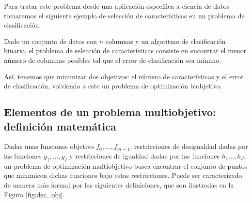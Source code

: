 Para tratar este problema desde una aplicación específica a ciencia de datos tomaremos el siguiente ejemplo de selección de características en un problema de clasificación:

\begin{texample} \label{ex:Selecc}
    Dado un conjunto de datos con $n$ columnas y un algoritmo de clasificación binario, el problema de selección de características consiste en encontrar el menor número de columnas posibles tal que el error de clasificación sea mínimo.
    
    Así, tenemos que minimizar dos objetivos: el número de características y el error de clasificación, volviendo a este un problema de optimización biobjetivo. 
\end{texample}


\subsection{Elementos de un problema multiobjetivo: definición matemática} \label{sec:Dominancia_Pareto}

Dadas unas funciones objetivo $f_0,\ldots, f_{m-1}$, restricciones de desigualdad dadas por las funciones $g_1,\ldots,g_I$ y restricciones de igualdad dadas por las funciones $h_1 \ldots, h_J$, un problema de optimización multiobjetivo busca encontrar el conjunto de puntos que minimicen dichas funciones bajo estas restricciones. Puede ser caracterizado de manera más formal por las siguientes definiciones, que son ilustradas en la Figura \ref{fig:dec_obj}. 

